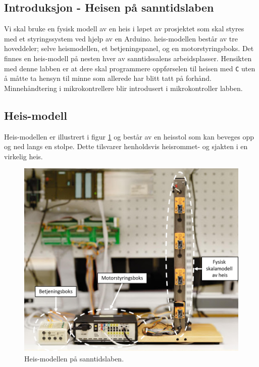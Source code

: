 \begin{alphasection}
\clearpage

\section{Introduksjon - Heisen på sanntidslaben}\label{sec:2-innføringheis}

Vi skal bruke en fysisk modell av en heis i løpet av prosjektet som skal styres med et styringssystem ved hjelp av en Arduino. heis-modellen består av tre hoveddeler; selve heismodellen, et betjeningspanel, og en motorstyringsboks. Det finnes en heis-modell på nesten hver av sanntidssalens arbeidsplasser. Hensikten med denne labben er at dere skal programmere oppførselen til heisen med \verb|C| uten å måtte ta hensyn til minne som allerede har blitt tatt på forhånd. Minnehåndtering i mikrokontrellere blir introdusert i mikrokontroller labben.



\subsection{Heis-modell}
Heis-modellen er illustrert i figur \ref{fig:heis-modell-sal} og består av en heisstol som kan beveges opp og ned langs en stolpe. Dette tilsvarer henholdsvis heisrommet- og sjakten i en virkelig heis.

\begin{figure}[ht]
    \centering
    \includegraphics[scale=.85]{Main/figures/HEIS.png}
    \caption{Heis-modellen på sanntidslaben.}
    \label{fig:heis-modell-sal}
\end{figure}


\end{alphasection}
